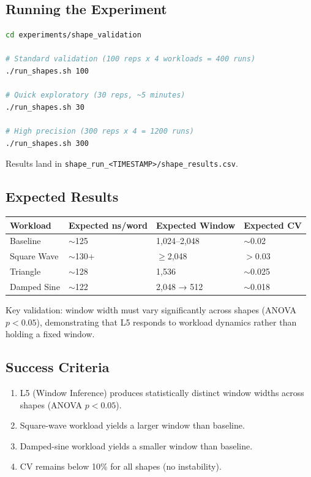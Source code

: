 \subsection{Running the Experiment}

\begin{lstlisting}[language=bash]
cd experiments/shape_validation

# Standard validation (100 reps x 4 workloads = 400 runs)
./run_shapes.sh 100

# Quick exploratory (30 reps, ~5 minutes)
./run_shapes.sh 30

# High precision (300 reps x 4 = 1200 runs)
./run_shapes.sh 300
\end{lstlisting}

Results land in \texttt{shape\_run\_<TIMESTAMP>/shape\_results.csv}.

\subsection{Expected Results}

\begin{center}
\begin{tabular}{llll}
\toprule
Workload    & Expected ns/word & Expected Window & Expected CV \\
\midrule
Baseline    & $\sim$125        & 1{,}024--2{,}048 & $\sim$0.02 \\
Square Wave & $\sim$130+       & $\geq$2{,}048    & $>$0.03 \\
Triangle    & $\sim$128        & 1{,}536          & $\sim$0.025 \\
Damped Sine & $\sim$122        & 2{,}048 → 512   & $\sim$0.018 \\
\bottomrule
\end{tabular}
\end{center}

Key validation: window width must vary significantly across shapes
(ANOVA $p < 0.05$), demonstrating that L5 responds to workload dynamics
rather than holding a fixed window.

\subsection{Success Criteria}

\begin{enumerate}
  \item L5 (Window Inference) produces statistically distinct window widths
        across shapes (ANOVA $p < 0.05$).
  \item Square-wave workload yields a larger window than baseline.
  \item Damped-sine workload yields a smaller window than baseline.
  \item CV remains below 10\% for all shapes (no instability).
\end{enumerate}
